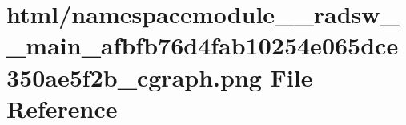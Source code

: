 \hypertarget{namespacemodule____radsw____main__afbfb76d4fab10254e065dce350ae5f2b__cgraph_8png}{}\section{html/namespacemodule\+\_\+\+\_\+radsw\+\_\+\+\_\+main\+\_\+afbfb76d4fab10254e065dce350ae5f2b\+\_\+cgraph.png File Reference}
\label{namespacemodule____radsw____main__afbfb76d4fab10254e065dce350ae5f2b__cgraph_8png}
